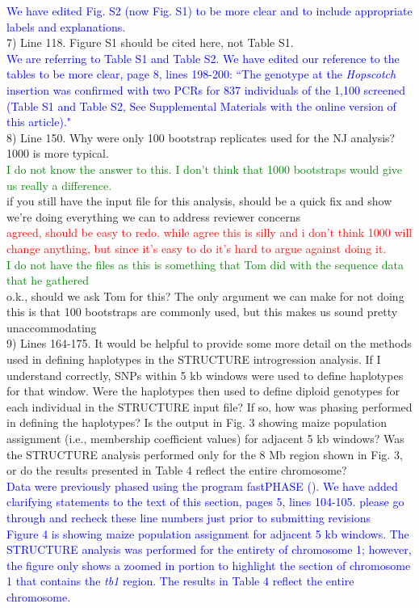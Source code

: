 \documentclass[11pt]{article}
\newcommand{\res}[1]{\noindent \textcolor{blue}{{#1}} \\}
\newcommand{\jri}[1]{\noindent \textcolor{red}{{#1}} \\}
\newcommand{\lev}[1]{\noindent \textcolor{green}{{#1}} \\}
\newcommand{\mbh}[1]{\noindent \textcolor{Dandelion}{{#1}}\\}
\begin{document}
\res{We have edited Fig. S2 (now Fig. S1) to be more clear and to include appropriate labels and explanations.}

7) Line 118. Figure S1 should be cited here, not Table S1. \\

\res{We are referring to Table S1 and Table S2. We have edited our reference to the tables to be more clear, page 8, lines 198-200: ``The genotype at the \emph{Hopscotch} insertion was confirmed with two PCRs for 837 individuals of the 1,100 screened (Table S1 and Table S2, See Supplemental Materials with the online version of this article)."}

8) Line 150. Why were only 100 bootstrap replicates used for the NJ analysis? 1000 is more typical.\\
\lev{I do not know the answer to this. I don't think that 1000 bootstraps would give us really a difference.}
\mbh{if you still have the input file for this analysis, should be a quick fix and show we're doing everything we can to address reviewer concerns}
\jri{agreed, should be easy to redo. while agree this is silly and i don't think 1000 will change anything, but since it's easy to do it's hard to argue against doing it.}
\lev{I do not have the files as this is something that Tom did with the sequence data that he gathered}
\mbh{o.k., should we ask Tom for this? The only argument we can make for not doing this is that 100 bootstraps are commonly used, but this makes us sound pretty unaccommodating}

9) Lines 164-175. It would be helpful to provide some more detail on the methods used in defining haplotypes in the STRUCTURE introgression analysis. If I understand correctly, SNPs within 5 kb windows were used to define haplotypes for that window. Were the haplotypes then used to define diploid genotypes for each individual in the STRUCTURE input file? If so, how was phasing performed in defining the haplotypes? Is the output in Fig. 3 showing maize population assignment (i.e., membership coefficient values) for adjacent 5 kb windows? Was the STRUCTURE analysis performed only for the 8 Mb region shown in Fig. 3, or do the results presented in Table 4 reflect the entire chromosome? \\

\res{Data were previously phased using the program fastPHASE (\citet{Pyhajarvi2013, Scheet2006}). We have added clarifying statements to the text of this section, pages 5, lines 104-105. \mbh{please go through and recheck these line numbers just prior to submitting revisions} Figure 4 is showing maize population assignment for adjacent 5 kb windows. The STRUCTURE analysis was performed for the entirety of chromosome 1; however, the figure only shows a zoomed in portion to highlight the section of chromosome 1 that contains the \emph{tb1} region. The results in Table 4 reflect the entire chromosome.}
\end{document}
